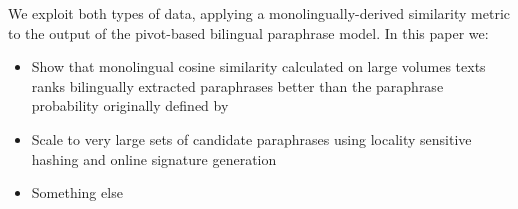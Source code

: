 \documentclass[11pt]{article}
\begin{document}

We exploit both types of data, applying a monolingually-derived similarity metric to the output of the pivot-based bilingual paraphrase model.  In this paper we:
\begin{itemize}
\item Show that monolingual cosine similarity calculated on large volumes texts ranks bilingually extracted paraphrases better than the paraphrase probability originally defined by 
\item Scale to very large sets of candidate paraphrases using locality sensitive hashing and online signature generation \cite{Charikar02,VanDurmeLallACL10}
\item Something else
\end{itemize}



%
\end{document}
